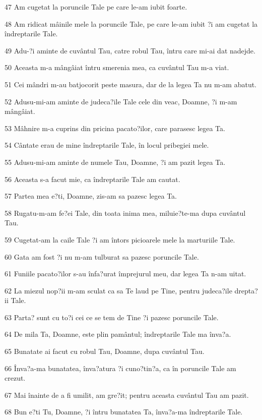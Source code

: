 \par 47 Am cugetat la poruncile Tale pe care le-am iubit foarte.
\par 48 Am ridicat mâinile mele la poruncile Tale, pe care le-am iubit ?i am cugetat la îndreptarile Tale.
\par 49 Adu-?i aminte de cuvântul Tau, catre robul Tau, întru care mi-ai dat nadejde.
\par 50 Aceasta m-a mângâiat întru smerenia mea, ca cuvântul Tau m-a viat.
\par 51 Cei mândri m-au batjocorit peste masura, dar de la legea Ta nu m-am abatut.
\par 52 Adusu-mi-am aminte de judeca?ile Tale cele din veac, Doamne, ?i m-am mângâiat.
\par 53 Mâhnire m-a cuprins din pricina pacato?ilor, care parasesc legea Ta.
\par 54 Cântate erau de mine îndreptarile Tale, în locul pribegiei mele.
\par 55 Adusu-mi-am aminte de numele Tau, Doamne, ?i am pazit legea Ta.
\par 56 Aceasta s-a facut mie, ca îndreptarile Tale am cautat.
\par 57 Partea mea e?ti, Doamne, zis-am sa pazesc legea Ta.
\par 58 Rugatu-m-am fe?ei Tale, din toata inima mea, miluie?te-ma dupa cuvântul Tau.
\par 59 Cugetat-am la caile Tale ?i am întors picioarele mele la marturiile Tale.
\par 60 Gata am fost ?i nu m-am tulburat sa pazesc poruncile Tale.
\par 61 Funiile pacato?ilor s-au înfa?urat împrejurul meu, dar legea Ta n-am uitat.
\par 62 La miezul nop?ii m-am sculat ca sa Te laud pe Tine, pentru judeca?ile drepta?ii Tale.
\par 63 Parta? sunt cu to?i cei ce se tem de Tine ?i pazesc poruncile Tale.
\par 64 De mila Ta, Doamne, este plin pamântul; îndreptarile Tale ma înva?a.
\par 65 Bunatate ai facut cu robul Tau, Doamne, dupa cuvântul Tau.
\par 66 Înva?a-ma bunatatea, înva?atura ?i cuno?tin?a, ca în poruncile Tale am crezut.
\par 67 Mai înainte de a fi umilit, am gre?it; pentru aceasta cuvântul Tau am pazit.
\par 68 Bun e?ti Tu, Doamne, ?i întru bunatatea Ta, înva?a-ma îndreptarile Tale.
